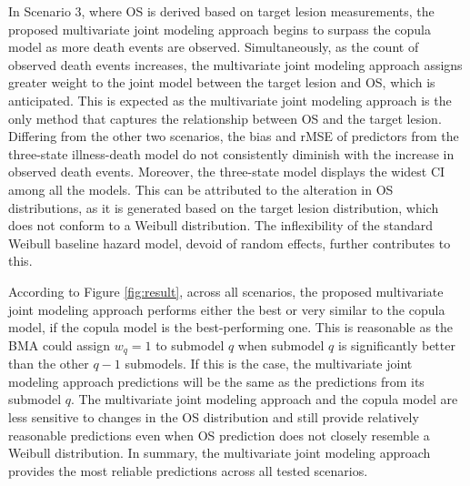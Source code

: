 In Scenario 3, where \ac{OS} is derived based on target lesion measurements, the proposed multivariate joint modeling approach begins to surpass the copula model as more death events are observed. Simultaneously, as the count of observed death events increases, the multivariate joint modeling approach assigns greater weight to the joint model between the target lesion and OS, which is anticipated. This is expected as the multivariate joint modeling approach is the only method that captures the relationship between \ac{OS} and the target lesion. Differing from the other two scenarios, the bias and \ac{rMSE} of predictors from the three-state illness-death model do not consistently diminish with the increase in observed death events. Moreover, the three-state model displays the widest \ac{CI} among all the models. This can be attributed to the alteration in \ac{OS} distributions, as it is generated based on the target lesion distribution, which does not conform to a Weibull distribution. The inflexibility of the standard Weibull baseline hazard model, devoid of random effects, further contributes to this.

According to Figure \ref{fig:result}, across all scenarios, the proposed multivariate joint modeling approach performs either the best or very similar to the copula model, if the copula model is the best-performing one. This is reasonable as the \ac{BMA} could assign $w_q = 1$ to submodel $q$ when submodel $q$ is significantly better than the other $q-1$ submodels. If this is the case, the multivariate joint modeling approach predictions will be the same as the predictions from its submodel $q$. The multivariate joint modeling approach and the copula model are less sensitive to changes in the \ac{OS} distribution and still provide relatively reasonable predictions even when \ac{OS} prediction does not closely resemble a Weibull distribution. In summary, the multivariate joint modeling approach provides the most reliable predictions across all tested scenarios.

